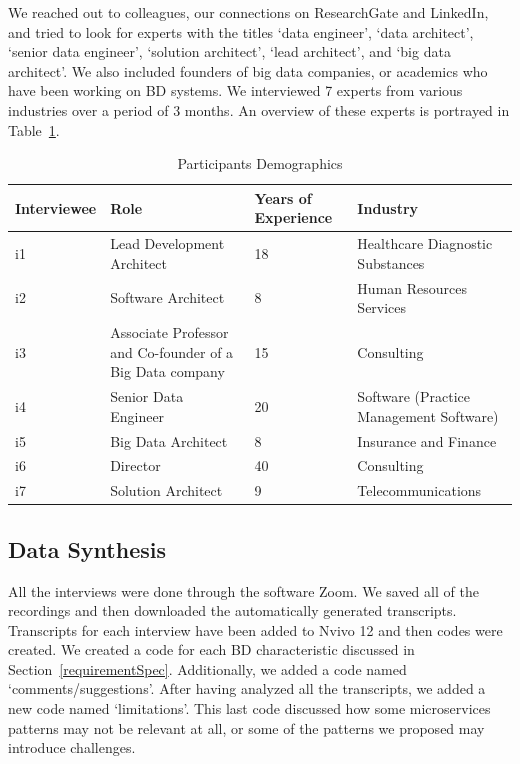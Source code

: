 \documentclass{bmcart}
\begin{document}
We reached out to colleagues, our connections on ResearchGate and LinkedIn, and tried to look for experts with the titles `data engineer', `data architect', `senior data engineer', `solution architect', `lead architect', and `big data architect'. We also included founders of big data companies, or academics who have been working on BD systems. We interviewed 7 experts from various industries over a period of 3 months. An overview of these experts is portrayed in Table~\ref{interviewees}. 


\begin{table}[h]
  \renewcommand{\arraystretch}{1.5}
  \caption[]{Participants Demographics}
  \begin{tabular}{|p{1.4cm}|p{4cm}|p{1.5cm}|p{2.5cm}|}
      \hline
      Interviewee & Role & Years of Experience  & Industry \\  

      \hline
      i1 & Lead Development Architect & 18 &  Healthcare Diagnostic Substances \\   
      \hline
      i2 & Software Architect & 8 &  Human Resources Services  \\   
      \hline
      i3 & Associate Professor and Co-founder of a Big Data company & 15 &  Consulting \\   
      \hline
      i4 & Senior Data Engineer & 20 &  Software (Practice Management Software) \\   
      \hline
      i5 & Big Data Architect & 8 &  Insurance and Finance \\   
      \hline
      i6 & Director & 40 &  Consulting \\   
      \hline
      i7 & Solution Architect & 9 &  Telecommunications \\   
      \hline
      
  \end{tabular}
  \label{interviewees}
\end{table}


\subsection{Data Synthesis}

All the interviews were done through the software Zoom. We saved all of the recordings and then downloaded the automatically generated transcripts. Transcripts for each interview have been added to Nvivo 12 and then codes were created. We created a code for each BD characteristic discussed in Section~\ref{requirementSpec}. Additionally, we added a code named `comments/suggestions'. After having analyzed all the transcripts, we added a new code named `limitations'. This last code discussed how some microservices patterns may not be relevant at all, or some of the patterns we proposed may introduce challenges. 
\end{document}
